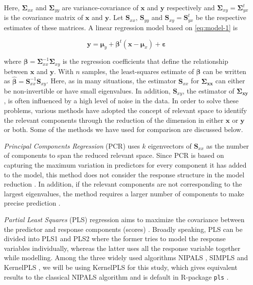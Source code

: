 \documentclass[12pt,3p,authoryear]{elsarticle}
\begin{document}
Here, \(\boldsymbol{\Sigma}_{xx}\) and \(\boldsymbol{\Sigma}_{yy}\) are variance-covariance of \(\mathbf{x}\) and \(\mathbf{y}\) respectively and \(\boldsymbol{\Sigma}_{xy}=\boldsymbol{\Sigma}_{yx}^t\) is the covariance matrix of \(\mathbf{x}\) and \(\mathbf{y}\). Let \(\mathbf{S}_{xx}\), \(\mathbf{S}_{yy}\) and \(\mathbf{S}_{xy}=\mathbf{S}_{yx}^t\) be the respective estimates of these matrices. A linear regression model based on \eqref{eq:model-1} is

\begin{equation}
\mathbf{y} = \boldsymbol{\mu}_y + \boldsymbol{\beta}^t\left( \mathbf{x} - \boldsymbol{\mu}_{x} \right) + \boldsymbol{\varepsilon}
\label{eq:reg-model}
\end{equation}

where \(\boldsymbol{\beta}=\boldsymbol{\Sigma}_{xx}^{-1}\boldsymbol{\Sigma}_{xy}\)
is the regression coefficients that define the relationship between \(\mathbf{x}\)
and \(\mathbf{y}\). With \(n\) samples, the least-squares estimate of
\(\boldsymbol{\beta}\) can be written as
\(\boldsymbol{\hat{\beta}}=\mathbf{S}_{xx}^{-1}\mathbf{S}_{xy}\). Here, as in many
situations, the estimator \(\mathbf{S}_{xx}\) for \(\boldsymbol{\Sigma_{xx}}\) can either be non-invertible or have small eigenvalues. In addition, \(\mathbf{S}_{xy}\), the estimator of \(\boldsymbol{\Sigma_{xy}}\), is often influenced by a high level of noise in the data. In order to solve these problems, various methods have adopted the concept of relevant space to identify the relevant components through the reduction of the dimension in either \(\mathbf{x}\) or \(\mathbf{y}\) or both. Some of the methods we have used for comparison are discussed below.

\emph{Principal Components Regression} (PCR) uses \(k\) eigenvectors of \(\mathbf{S}_{xx}\) as the number of components to span the reduced relevant space. Since PCR is based on capturing the maximum variation in predictors for every component it has added to the model, this method does not consider the response structure in the model reduction \citep{Jolliffe2002}. In addition, if the relevant components are not corresponding to the largest eigenvalues, the method requires a larger number of components to make precise prediction \citep{Alm_y_1996}.

\emph{Partial Least Squares} (PLS) regression aims to maximize the covariance between the predictor and response components (scores) \citep{DeJong1993}. Broadly speaking, PLS can be divided into PLS1 and PLS2 where the former tries to model the response variables individually, whereas the latter uses all the response variable together while modelling. Among the three widely used algorithms NIPALS \citep{wold75nipals}, SIMPLS \citep{DeJong1993} and KernelPLS \citep{Lindgren_1993}, we will be using KernelPLS for this study, which gives equivalent results to the classical NIPALS algorithm and is default in R-package \texttt{pls} \citep{mevik07_thepl}.
\end{document}
